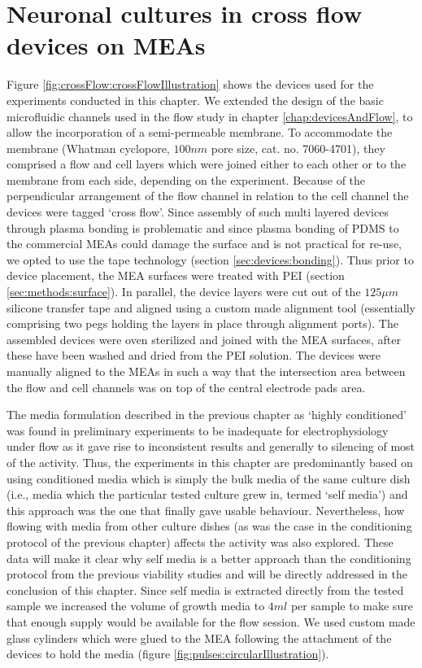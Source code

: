 \section{Neuronal cultures in cross flow devices on MEAs}
Figure \ref{fig:crossFlow:crossFlowIllustration} shows the devices used for the experiments conducted in this chapter. We extended the design of the basic microfluidic channels used in the flow study in chapter \ref{chap:devicesAndFlow}, to allow the incorporation of a semi-permeable membrane. To accommodate the membrane (Whatman cyclopore, \(100 nm\) pore size, cat. no. 7060-4701), they comprised a flow and cell layers which were joined either to each other or to the membrane from each side, depending on the experiment. Because of the perpendicular arrangement of the flow channel in relation to the cell channel the devices were tagged `cross flow'. Since assembly of such multi layered devices through plasma bonding is problematic and since plasma bonding of PDMS to the commercial MEAs could damage the surface and is not practical for re-use, we opted to use the tape technology (section \ref{sec:devices:bonding}). Thus prior to device placement, the MEA surfaces were treated with PEI (section \ref{sec:methods:surface}). In parallel, the device layers were cut out of the \(125 \mu m\) silicone transfer tape and aligned using a custom made alignment tool (essentially comprising two pegs holding the layers in place through alignment ports). The assembled devices were oven sterilized and joined with the MEA surfaces, after these have been washed and dried from the PEI solution. The devices were manually aligned to the MEAs in such a way that the intersection area between the flow and cell channels was on top of the central electrode pads area.

The media formulation described in the previous chapter as `highly conditioned' was found in preliminary experiments to be inadequate for electrophysiology under flow as it gave rise to inconsistent results and generally to silencing of most of the activity. Thus, the experiments in this chapter are predominantly based on using conditioned media which is simply the bulk media of the same culture dish (i.e., media which the particular tested culture grew in, termed `self media') and this approach was the one that finally gave usable behaviour. Nevertheless, how flowing with media from other culture dishes (as was the case in the conditioning protocol of the previous chapter) affects the activity was also explored. These data will make it clear why self media is a better approach than the conditioning protocol from the previous viability studies and will be directly addressed in the conclusion of this chapter. Since self media is extracted directly from the tested sample we increased the volume of growth media to \(4 ml\) per sample to make sure that enough supply would be available for the flow session. We used custom made glass cylinders which were glued to the MEA following the attachment of the devices to hold the media (figure \ref{fig:pulses:circularIllustration}).

